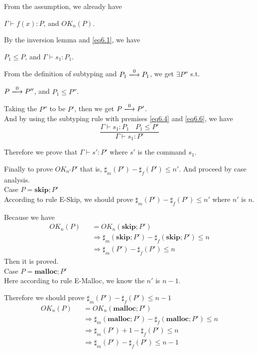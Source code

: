 \documentclass[english]{jssst_ppl} %
\newcommand\SKIP{\mathbf{skip}}
\newcommand\Malloc{\mathbf{malloc}}
\begin{document}
From the assumption, we already have
\begin{center}
$\Gamma \vdash f(x) : P$, and $OK_{n}(P)$.
\end{center}

By the inversion lemma and \eqref{eq6.1}, we have
\begin{center}
$P_{1} \le P$, and $\Gamma \vdash s_{1} : P_{1}$.
\end{center}

From the definition of subtyping and $P_{1} \xlongrightarrow{0} P_{1}$, we get $\exists P''$ s.t.
\begin{center}
$P \xlongrightarrow{0} P''$, and $P_{1} \le P''$.
\end{center}

Taking the $P''$ to be $P'$, then we get $P \xlongrightarrow{0} P'$.\\
And by using the subtyping rule with premises \eqref{eq6.4} and  \eqref{eq6.6}, we have
$$
\frac{\Gamma \vdash s_{1} : P_{1} \ \ \ \ P_{1} \le P'}{\Gamma \vdash s_{1} : P'}
$$

Therefore we prove that $\Gamma \vdash s' : P'$ where $s'$ is the command $s_{1}$.

\noindent Finally to prove $OK_{n'}P'$ that is, $\sharp_{m}(P')-\sharp_{f}(P') \le n'$. And  proceed by case analysis.\\

\noindent Case $P =  \SKIP;P'$\\

According to rule E-Skip, we should prove  $\sharp_{m}(P')-\sharp_{f}(P') \le n'$ where $n'$ is $n$.

Because we have
\begin{eqnarray*}
  OK_{n}(P)  & & =  OK_{n}(\SKIP;P')\\
  & & \Rightarrow \sharp_{m}(\SKIP;P') - \sharp_{f}(\SKIP;P') \le n \\
  & & \Rightarrow \sharp_{m}(P') - \sharp_{f}(P') \le n \
\end{eqnarray*}
Then it is proved. \\

\noindent Case $P = \Malloc;P'$ \\

Here according to rule E-Malloc, we know the $n'$ is $n-1$.

Therefore we should prove $\sharp_{m}(P') - \sharp_{f}(P') \le n-1$
\begin{eqnarray*}
  OK_{n}(P)&& =  OK_{n}(\Malloc;P')\\
  &&\Rightarrow \sharp_{m}(\Malloc;P') - \sharp_{f}(\Malloc;P') \le n \\
  &&\Rightarrow  \sharp_{m}(P') + 1 - \sharp_{f}(P') \le n\\
  &&\Rightarrow  \sharp_{m}(P')  - \sharp_{f}(P') \le n-1\\
\end{eqnarray*}
\end{document}
